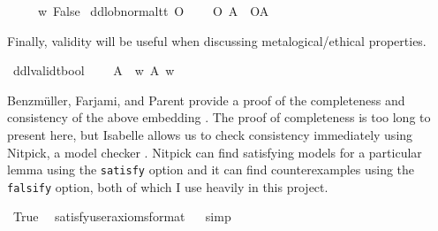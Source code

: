 \begin{isabellebody}
\ \ \ {\isachardoublequoteopen}\isactrlbold {\isasymbottom}\ {\isasymequiv}\ {\isasymlambda}w{\isachardot}\ False{\isachardoublequoteclose}\isanewline
{}\isamarkupfalse%
\ ddlob{\isacharunderscore}normal{\isacharcolon}{\isacharcolon}{\isachardoublequoteopen}t{\isasymRightarrow}t{\isachardoublequoteclose}\ {\isacharparenleft}{\isachardoublequoteopen}O\ {\isacharbraceleft}{\isacharunderscore}{\isacharbraceright}{\isachardoublequoteclose}{\isacharparenright}\isanewline
\ \ \ {\isachardoublequoteopen}{\isacharparenleft}O\ {\isacharbraceleft}A{\isacharbraceright}{\isacharparenright}\ {\isasymequiv}\ {\isacharparenleft}O{\isacharbraceleft}A{\isacharbar}\isactrlbold {\isasymtop}{\isacharbraceright}{\isacharparenright}\ {\isachardoublequoteclose}\isanewline
%
%
\begin{isamarkuptext}%
\noindent Finally, validity will be useful when discussing metalogical/ethical properties.%
\end{isamarkuptext}\isamarkuptrue%
\isamarkupfalse%
\ ddlvalid{\isacharcolon}{\isacharcolon}{\isachardoublequoteopen}t{\isasymRightarrow}bool{\isachardoublequoteclose}\ {\isacharparenleft}{\isachardoublequoteopen}{\isasymTurnstile}{\isacharunderscore}{\isachardoublequoteclose}{\isacharparenright}\isanewline
\ \ \ {\isachardoublequoteopen}{\isasymTurnstile}A\ {\isasymequiv}\ {\isasymforall}w{\isachardot}\ A\ w{\isachardoublequoteclose}\isanewline
%
%
\begin{isamarkuptext}%
Benzm\"uller, Farjami, and Parent provide a proof of the completeness and consistency of the above embedding \citep{BFP}.
The proof of completeness is too long to present here, but Isabelle allows us to check consistency 
immediately using Nitpick, a model checker \citep{nitpick}.
Nitpick can find satisfying models for a particular lemma using the \texttt{satisfy} option and it can 
find counterexamples using the \texttt{falsify} option, both of which I use heavily in this project.%
\end{isamarkuptext}\isamarkuptrue%
\isamarkupfalse%
\ True\ \isamarkupfalse%
\ {\isacharbrackleft}satisfy{\isacharcomma}user{\isacharunderscore}axioms{\isacharcomma}format{\isacharequal}{}{\isacharbrackright}%
\isadelimproof
\ %
\endisadelimproof
%
\isatagproof
{}\isamarkupfalse%
\ simp\isanewline
%
\isanewline
%
\end{isabellebody}
